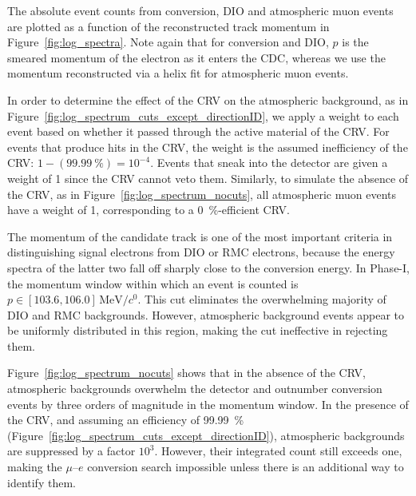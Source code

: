The absolute event counts from conversion, DIO and atmospheric muon events are
plotted as a function of the reconstructed track momentum in
Figure~\ref{fig:log_spectra}. Note again that for conversion and DIO, $p$ is the
smeared momentum of the electron as it enters the CDC, whereas we use the
momentum reconstructed via a helix fit for atmospheric muon events.


In order to determine the effect of the CRV on the atmospheric background, as in
Figure~\ref{fig:log_spectrum_cuts_except_directionID}, we apply a weight to each
event based on whether it passed through the active material of the CRV. For
events that produce hits in the CRV, the weight is the assumed inefficiency of
the CRV: $1 - (\SI{99.99}{\percent}) = 10^{-4}$. Events that sneak into the
detector are given a weight of 1 since the CRV cannot veto them. Similarly, to
simulate the absence of the CRV, as in Figure~\ref{fig:log_spectrum_nocuts}, all
atmospheric muon events have a weight of 1, corresponding to a
\SI{0}{\percent}-efficient CRV.







The momentum of the candidate track is one of the most important criteria in
distinguishing signal electrons from DIO or RMC
electrons, because the energy spectra of the latter two fall off sharply close
to the conversion energy. In Phase-I, the momentum window within which an event
is counted is $p \in [103.6, 106.0]\,\si{\MeV/\clight}$. This cut eliminates the
overwhelming majority of DIO and RMC backgrounds. However, atmospheric
background events appear to be uniformly distributed in this region, making the
cut ineffective in rejecting them. 

Figure~\ref{fig:log_spectrum_nocuts} shows that in the absence of the CRV,
atmospheric backgrounds overwhelm the detector and outnumber conversion events
by three orders of magnitude in the momentum window. In the presence of the CRV,
and assuming an efficiency of \SI{99.99}{\percent}
(Figure~\ref{fig:log_spectrum_cuts_except_directionID}), atmospheric backgrounds
are suppressed by a factor $10^3$. However, their integrated count still exceeds
one, making the $\mu$--$e$ conversion search impossible unless there is an
additional way to identify them.


